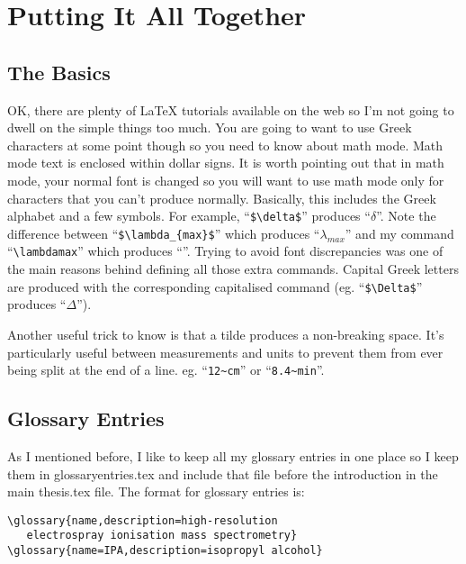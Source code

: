 
\chapter{Putting It All Together}
\label{ch:examples}

\section{The Basics}

OK, there are plenty of \LaTeX{} tutorials available on the web so I'm not going to dwell on the simple things too much.  You are going to want to use Greek characters at some point though so you need to know about math mode.  Math mode text is enclosed within dollar signs.  It is worth pointing out that in math mode, your normal font is changed so you will want to use math mode only for characters that you can't produce normally.  Basically, this includes the Greek alphabet and a few symbols.  For example, ``\small\verb&$\delta$&\normalsize'' produces ``$\delta$''.  Note the difference between ``\small\verb&$\lambda_{max}$&\normalsize'' which produces ``$\lambda_{max}$'' and my command ``\small\verb$\lambdamax$\normalsize'' which produces ``\lambdamax''.  Trying to avoid font discrepancies was one of the main reasons behind defining all those extra commands.  Capital Greek letters are produced with the corresponding capitalised command (eg. ``\small\verb&$\Delta$&\normalsize'' produces ``$\Delta$'').

Another useful trick to know is that a tilde produces a non-breaking space.  It's particularly useful between measurements and units to prevent them from ever being split at the end of a line.  eg. ``\small\verb$12~cm$\normalsize'' or ``\small\verb$8.4~min$\normalsize''.

\section{Glossary Entries}
As I mentioned before, I like to keep all my glossary entries in one place so I keep them in glossaryentries.tex and include that file before the introduction in the main thesis.tex file.  The format for glossary entries is:

\small\singlespacing
\begin{verbatim}
\glossary{name,description=high-resolution
   electrospray ionisation mass spectrometry}
\glossary{name=IPA,description=isopropyl alcohol}
\end{verbatim}

